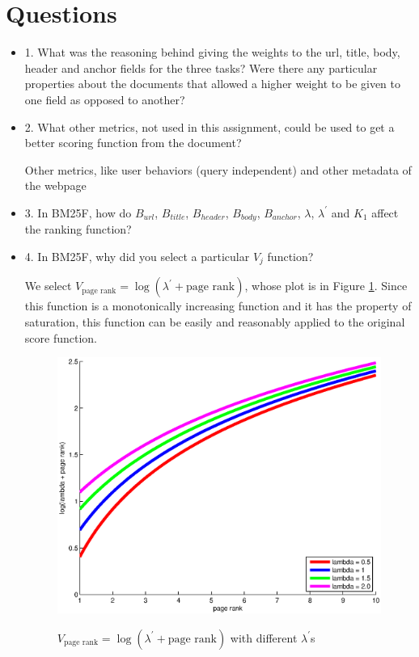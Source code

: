 \section{Questions}
\begin{itemize}
  \item[] 1. What was the reasoning behind giving the weights to the url, title, body, header and anchor fields for the three tasks? Were there any particular properties about the documents that allowed a higher weight to be given to one field as opposed to another?
      
      
  \item[] 2. What other metrics, not used in this assignment, could be used to get a better scoring function from the document?
      
      Other metrics, like user behaviors (query independent) and other metadata of the webpage 
      
  \item[] 3. In BM25F, how do $B_{url}$, $B_{title}$, $B_{header}$, $B_{body}$, $B_{anchor}$, $\lambda$, $\lambda^\prime$ and $K_1$ affect the ranking function?
      
  \item[] 4. In BM25F, why did you select a particular $V_j$ function?
  
  We select $V_\textrm{page rank} = \log(\lambda^\prime + \textrm{page rank})$, whose plot is in Figure \ref{img:logfunction}. Since this function is a monotonically increasing function and it has the property of saturation, this function can be easily and reasonably applied to the original score function.
\begin{figure}
\begin{center}
  \includegraphics[width=\textwidth]{V_function.eps} \\
  \caption{$V_\textrm{page rank} = \log(\lambda^\prime + \textrm{page rank})$ with different $\lambda^\prime$s}\label{img:logfunction}
\end{center}
\end{figure}
  

\end{itemize}

